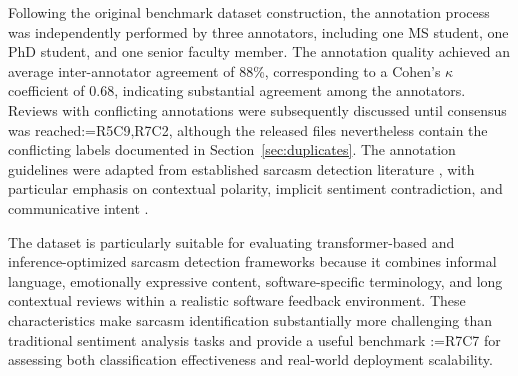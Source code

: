 \documentclass[a4paper,fleqn]{cas-sc}
\makeatletter
\newif\iftracked
\newcommand{\rv@setcolour}[1]{%
  \IfStrEq{#1}{R7C7}{\color{rvEdit}}{%
    \IfSubStr{#1}{R5}{\IfSubStr{#1}{R7}{\color{rvBoth}}{\color{rvFive}}}{\color{rvSeven}}}}
\newcommand{\rv@tag}[1]{\textsuperscript{\sffamily\bfseries\scriptsize[\StrSubstitute{#1}{,}{, }]}\,}
\newcommand{\rv@recordone}[1]{%
  \edef\rv@i{#1}%
  \ifcsdef{rv@n@\rv@i}{}{\csgdef{rv@n@\rv@i}{0}}%
  \csxdef{rv@n@\rv@i}{\the\numexpr\csuse{rv@n@\rv@i}+1\relax}%
  \begingroup\edef\@currentlabel{\rv@i}\label{rv:\rv@i:\csuse{rv@n@\rv@i}}\endgroup}
\newcommand{\rv@record}[1]{\@for\rv@id:=#1\do{\expandafter\rv@recordone\expandafter{\rv@id}}}
\DeclareRobustCommand{\rcdel}[2]{\rv@record{#1}\iftracked{\rv@setcolour{#1}\rv@tag{#1}\rv@strike{#2}}\else\unskip\fi}
\DeclareRobustCommand{\rcrep}[3]{\rv@record{#1}\iftracked{\rv@setcolour{#1}\rv@tag{#1}\rv@strike{#2} #3}\else#3\fi}
\makeatother
\begin{document}
Following the original benchmark dataset construction, the annotation process was independently performed by three annotators, including one MS student, one PhD student, and one senior faculty member. The annotation quality achieved an average inter-annotator agreement of 88\%, corresponding to a Cohen's $\kappa$ coefficient of 0.68, indicating substantial agreement among the annotators. Reviews with conflicting annotations were subsequently discussed until consensus was reached\rcrep{R5C9,R7C2}{, resulting in a conflict-free benchmark dataset}{, although the released files nevertheless contain the conflicting labels documented in Section~\ref{sec:duplicates}}. The annotation guidelines were adapted from established sarcasm detection literature \citep{fatima2024exploratory,sinha2023sarcasm,eke2020sarcasm}, with particular emphasis on contextual polarity, implicit sentiment contradiction, and communicative intent \citep{kamal2022cat,eke2020sarcasm}.

The dataset is particularly suitable for evaluating transformer-based and inference-optimized sarcasm detection frameworks because it combines informal language, emotionally expressive content, software-specific terminology, and long contextual reviews within a realistic software feedback environment. These characteristics make sarcasm identification substantially more challenging than traditional sentiment analysis tasks and provide a useful benchmark \rcdel{R7C7}{for evaluating} for assessing both classification effectiveness and real-world deployment scalability.
\end{document}

